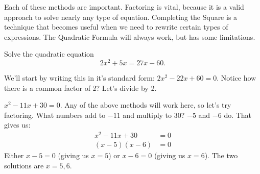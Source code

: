 \documentclass{ximera}
\begin{document}
Each of these methods are important.  Factoring is vital, because it is a valid approach to solve nearly any type of equation.  Completing
the Square is a technique that becomes useful when we need to rewrite certain types of expressions.  The Quadratic Formula will always
work, but has some limitations.

\begin{example}
	Solve the quadratic equation
	\[ 2x^2 +5x = 27 x - 60. \]
	\begin{explanation}
		We'll start by writing this in it's standard form: $2x^2 - 22x + 60 = 0$.  Notice how there is a common factor of 2? Let's divide by 2.
		
		$x^2 - 11x + 30 = 0$.  Any of the above methods will work here, so let's try factoring.  What numbers add to $-11$ and multiply to $30$?
		$-5$ and $-6$ do. That gives us:
		\begin{align*}
			x^2 - 11x + 30 &= 0\\
			(x-5)(x-6) &= 0
		\end{align*}
		Either $x-5 = 0$ (giving us $x=5$) or $x-6 = 0$ (giving us $x=6$).  The two solutions are $x = 5, 6$.
	\end{explanation}
\end{example}	
\end{document}
